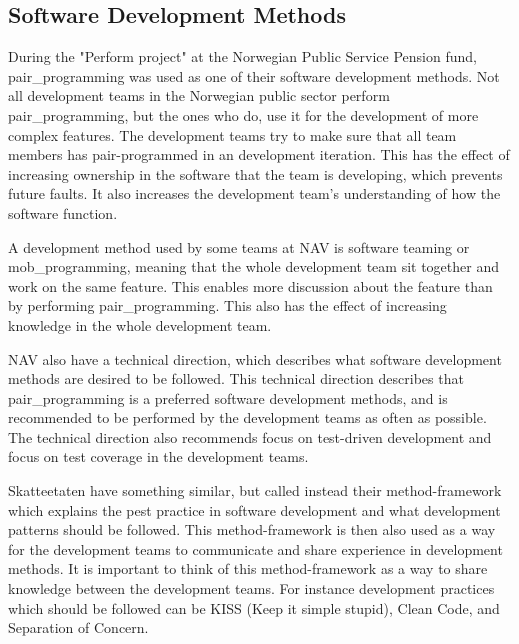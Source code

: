 
\subsection{Software Development Methods}
During the "Perform project" at the Norwegian Public Service Pension fund, \gls{pair_programming} was used as one of their software development methods. Not all development teams in the Norwegian public sector perform \gls{pair_programming}, but the ones who do, use it for the development of more complex features. The development teams try to make sure that all team members has pair-programmed in an development iteration. This has the effect of increasing ownership in the software that the team is developing, which prevents future faults. It also increases the development team's understanding of how the software function.

A development method used by some teams at NAV is software teaming or \gls{mob_programming}, meaning that the whole development team sit together and work on the same feature. This enables more discussion about the feature than by performing \gls{pair_programming}. This also has the effect of increasing knowledge in the whole development team.

NAV also have a technical direction, which describes what software development methods are desired to be followed. This technical direction describes that \gls{pair_programming} is a preferred software development methods, and is recommended to be performed by the development teams as often as possible. The technical direction also recommends focus on test-driven development and focus on test coverage in the development teams.

Skatteetaten have something similar, but called instead their method-framework which explains the pest practice in software development and what development patterns should be followed. This method-framework is then also used as a way for the development teams to communicate and share experience in development methods. It is important to think of this method-framework as a way to share knowledge between the development teams. For instance development practices which should be followed can be KISS (Keep it simple stupid), Clean Code, and Separation of Concern.

